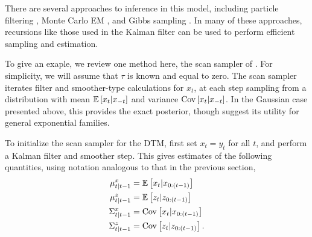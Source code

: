 \documentclass[14pt]{extreport}
\begin{document}
There are several approaches to inference in this model, including particle
filtering \citep{doucet2000rao}, Monte Carlo EM \citep{manrique1998simulation},
and Gibbs sampling \citep{de1997scan, wei1999bayesian}. In many of these
approaches, recursions like those used in the Kalman filter can be used to
perform efficient sampling and estimation.

To give an exaple, we review one method here, the scan sampler of
\citep{de1997scan}. For simplicity, we will assume that $\tau$ is known and
equal to zero. The scan sampler iterates filter and smoother-type calculations
for $x_t$, at each step sampling from a distribution with mean $\mathbb{E}\left[{x_t \vert
  x_{-t}}\right]$ and variance $\mathrm{Cov}\left[{x_t \vert x_{-t}}\right]$. In the Gaussian case
presented above, this provides the exact posterior, though \cite{de1997scan}
suggest its utility for general exponential families.

To initialize the scan sampler for the DTM, first set $x_t = y_t$ for all $t$,
and perform a Kalman filter and smoother step. This gives estimates of the
following quantities, using notation analogous to that in the previous section,
\begin{align*}
  \mu_{t \vert t - 1}^{x} &= \mathbb{E}\left[{x_t \vert x_{0:\left(t - 1\right)}}\right] \\
  \mu_{t \vert t - 1}^{z} &= \mathbb{E}\left[{z_t \vert z_{0:\left(t - 1\right)}}\right] \\
  \Sigma_{t \vert t - 1}^{x} &= \mathrm{Cov}\left[{x_t \vert x_{0:\left(t - 1\right)}}\right] \\
  \Sigma_{t \vert t - 1}^{z} &= \mathrm{Cov}\left[{z_t \vert z_{0 : \left(t - 1\right)}}\right].
\end{align*}
\end{document}
